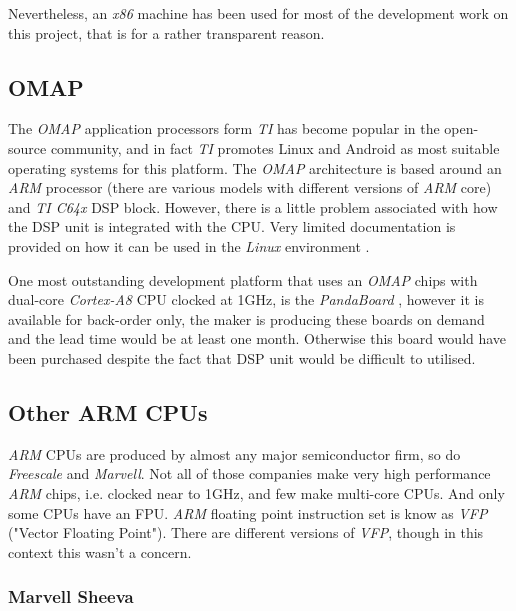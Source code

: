   Nevertheless, an \emph{x86} machine has been used for most of the
 development work on this project, that is for a rather transparent
 reason.

\subsection{OMAP}

  The \emph{OMAP} application processors form \emph{TI} has become
 popular in the open-source community, and in fact \emph{TI} promotes
 Linux and Android as most suitable operating systems for this platform.
 The \emph{OMAP} architecture is based around an \emph{ARM} processor
 (there are various models with different versions of \emph{ARM} core)
 and \emph{TI C64x} DSP block. However, there is a little problem
 associated with how the DSP unit is integrated with the CPU.
 Very limited documentation is provided on how it can be used in the
 \emph{Linux} environment \cite{ti:omap:wiki:dsp}.

 One most outstanding development platform that uses an \emph{OMAP}
 chips with dual-core \emph{Cortex-A8} CPU clocked at 1GHz, is the
 \emph{PandaBoard} \cite{ti:omap:wiki:pb}, however it is available
 for back-order only, the maker is producing these boards on demand
 and the lead time would be at least one month. Otherwise this board
 would have been purchased despite the fact that DSP unit would be
 difficult to utilised.


\subsection{Other ARM CPUs}

  \emph{ARM} CPUs are produced by almost any major semiconductor firm,
 so do \emph{Freescale} and \emph{Marvell}. Not all of those companies
 make very high performance \emph{ARM} chips, i.e. clocked near to 1GHz,
 and few make multi-core CPUs. And only some CPUs have an FPU.
 \emph{ARM} floating point instruction set is know as \emph{VFP}
 ("Vector Floating Point"). There are different versions of \emph{VFP},
 though in this context this wasn't a concern.

\subsubsection{Marvell Sheeva}

